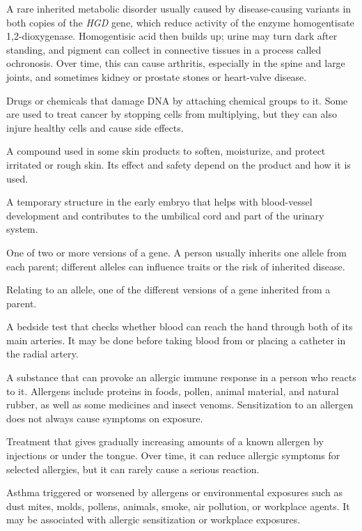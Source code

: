  A rare inherited metabolic disorder usually caused by disease-causing variants in both copies of the \textit{HGD} gene, which reduce activity of the enzyme homogentisate 1,2-dioxygenase. Homogentisic acid then builds up; urine may turn dark after standing, and pigment can collect in connective tissues in a process called ochronosis. Over time, this can cause arthritis, especially in the spine and large joints, and sometimes kidney or prostate stones or heart-valve disease.

 Drugs or chemicals that damage DNA by attaching chemical groups to it. Some are used to treat cancer by stopping cells from multiplying, but they can also injure healthy cells and cause side effects.

 A compound used in some skin products to soften, moisturize, and protect irritated or rough skin. Its effect and safety depend on the product and how it is used.

 A temporary structure in the early embryo that helps with blood-vessel development and contributes to the umbilical cord and part of the urinary system.

 One of two or more versions of a gene. A person usually inherits one allele from each parent; different alleles can influence traits or the risk of inherited disease.

 Relating to an allele, one of the different versions of a gene inherited from a parent.

 A bedside test that checks whether blood can reach the hand through both of its main arteries. It may be done before taking blood from or placing a catheter in the radial artery.

 A substance that can provoke an allergic immune response in a person who reacts to it. Allergens include proteins in foods, pollen, animal material, and natural rubber, as well as some medicines and insect venoms. Sensitization to an allergen does not always cause symptoms on exposure.

 Treatment that gives gradually increasing amounts of a known allergen by injections or under the tongue. Over time, it can reduce allergic symptoms for selected allergies, but it can rarely cause a serious reaction.

 Asthma triggered or worsened by allergens or environmental exposures such as dust mites, molds, pollens, animals, smoke, air pollution, or workplace agents. It may be associated with allergic sensitization or workplace exposures.

